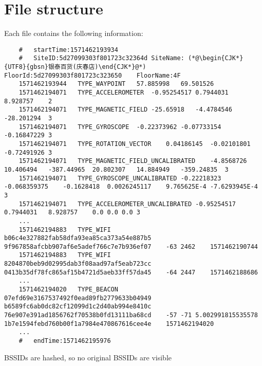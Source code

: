 \section{File structure}\label{sec:file-structure}
Each file contains the following information:




\begin{lstlisting}
    #	startTime:1571462193934
    #	SiteID:5d27099303f801723c32364d	SiteName: (*@\begin{CJK*}{UTF8}{gbsn}银泰百货(庆春店)\end{CJK*}@*) FloorId:5d27099303f801723c323650	FloorName:4F
    1571462193944	TYPE_WAYPOINT	57.885998	69.501526
    1571462194071	TYPE_ACCELEROMETER	-0.95254517	0.7944031	8.928757	2
    1571462194071	TYPE_MAGNETIC_FIELD	-25.65918	-4.4784546	-28.201294	3
    1571462194071	TYPE_GYROSCOPE	-0.22373962	-0.07733154	-0.16847229	3
    1571462194071	TYPE_ROTATION_VECTOR	0.04186145	-0.02101801	-0.72491926	3
    1571462194071	TYPE_MAGNETIC_FIELD_UNCALIBRATED	-4.8568726	10.406494	-387.44965	20.802307	14.884949	-359.24835	3
    1571462194071	TYPE_GYROSCOPE_UNCALIBRATED	-0.22218323	-0.068359375	-0.1628418	0.0026245117	9.765625E-4	-7.6293945E-4	3
    1571462194071	TYPE_ACCELEROMETER_UNCALIBRATED	-0.95254517	0.7944031	8.928757	0.0	0.0	0.0	3
    ...
    1571462194883	TYPE_WIFI	b06c4e327882fab58dfa93ea85ca373a54e887b5	9f967858afcbb907af6e5adef766c7e7b936ef07	-63	2462	1571462190744
    1571462194883	TYPE_WIFI	8204870beb9d02995dab3f08aad97af5eab723cc	0413b35df78fc865af15b4721d5aeb33ff57da45	-64	2447	1571462188686
    ...
    1571462194020	TYPE_BEACON	07efd69e3167537492f0ead89fb2779633b04949	b6589fc6ab0dc82cf12099d1c2d40ab994e8410c	76e907e391ad1856762f70538b0fd13111ba68cd	-57	-71	5.002991815535578	1b7e1594febd760b00f1a7984e470867616cee4e	1571462194020
    ...
    #	endTime:1571462195976
\end{lstlisting}





BSSIDs are hashed, so no original BSSIDs are visible

